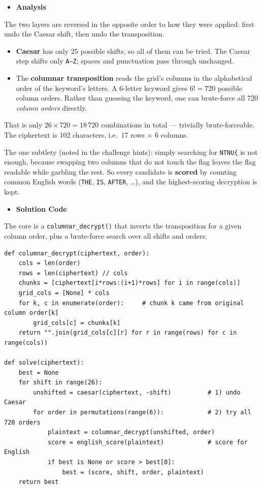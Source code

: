 \documentclass[11pt]{article}
\begin{document}
\begin{itemize}[leftmargin=1.5em]
    \item \textbf{Analysis}
\end{itemize}
\noindent The two layers are reversed in the opposite order to how they were applied: first undo the Caesar shift, then undo the transposition.
\begin{itemize}[leftmargin=2.2em]
    \item \textbf{Caesar} has only 25 possible shifts, so all of them can be tried. The Caesar step shifts only \texttt{A--Z}; spaces and punctuation pass through unchanged.
    \item The \textbf{columnar transposition} reads the grid's columns in the alphabetical order of the keyword's letters. A 6-letter keyword gives $6! = 720$ possible column orders. Rather than guessing the keyword, one can brute-force all 720 \emph{column orders} directly.
\end{itemize}
\noindent That is only $26 \times 720 = 18\,720$ combinations in total --- trivially brute-forceable. The ciphertext is 102 characters, i.e.\ 17 rows $\times$ 6 columns.

\noindent The one subtlety (noted in the challenge hints): simply searching for \texttt{NTNU\{} is not enough, because swapping two columns that do not touch the flag leaves the flag readable while garbling the rest. So every candidate is \textbf{scored} by counting common English words (\texttt{THE}, \texttt{IS}, \texttt{AFTER}, \ldots), and the highest-scoring decryption is kept.

\begin{itemize}[leftmargin=1.5em]
    \item \textbf{Solution Code}
\end{itemize}
\noindent The core is a \texttt{columnar\_decrypt()} that inverts the transposition for a given column order, plus a brute-force search over all shifts and orders:

\begin{footnotesize}
\begin{verbatim}
def columnar_decrypt(ciphertext, order):
    cols = len(order)
    rows = len(ciphertext) // cols
    chunks = [ciphertext[i*rows:(i+1)*rows] for i in range(cols)]
    grid_cols = [None] * cols
    for k, c in enumerate(order):     # chunk k came from original column order[k]
        grid_cols[c] = chunks[k]
    return "".join(grid_cols[c][r] for r in range(rows) for c in range(cols))

def solve(ciphertext):
    best = None
    for shift in range(26):
        unshifted = caesar(ciphertext, -shift)          # 1) undo Caesar
        for order in permutations(range(6)):            # 2) try all 720 orders
            plaintext = columnar_decrypt(unshifted, order)
            score = english_score(plaintext)            # score for English
            if best is None or score > best[0]:
                best = (score, shift, order, plaintext)
    return best
\end{verbatim}
\end{footnotesize}
\end{document}
